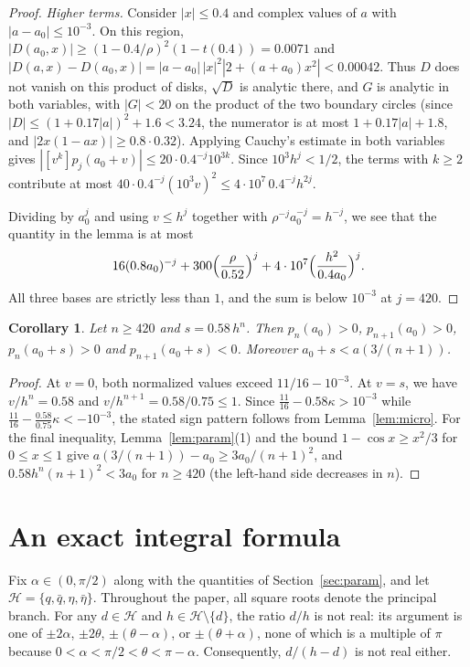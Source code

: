 \documentclass[11pt]{amsart}
\newtheorem{corollary}[theorem]{Corollary}
\theoremstyle{remark}
\begin{document}
\begin{proof}
\emph{Higher terms.} Consider $|x|\le0.4$ and complex values of $a$ with
$|a-a_0|\le10^{-3}$. On this region,
$|D(a_0,x)|\ge(1-0.4/\rho)^2(1-t(0.4))=0.0071$ and
$|D(a,x)-D(a_0,x)|=|a-a_0|\,|x|^2|2+(a+a_0)x^2|<0.00042$. Thus $D$ does not
vanish on this product of disks, $\sqrt D$ is analytic there, and $G$ is
analytic in both variables, with $|G|<20$ on the product of the two boundary
circles (since $|D|\le(1+0.17|a|)^2+1.6<3.24$, the numerator is at most
$1+0.17|a|+1.8$, and $|2x(1-ax)|\ge0.8\cdot0.32$). Applying Cauchy's estimate
in both variables gives $|[v^k]p_j(a_0+v)|\le20\cdot0.4^{-j}10^{3k}$. Since
$10^3h^j<1/2$, the terms with $k\ge2$ contribute at most
$40\cdot0.4^{-j}(10^3v)^2\le4\cdot10^7\,0.4^{-j}h^{2j}$.

Dividing by $a_0^j$ and using $v\le h^j$ together with
$\rho^{-j}a_0^{-j}=h^{-j}$, we see that the quantity in the lemma is at most
\[
 16(0.8a_0)^{-j}+300\Bigl(\frac{\rho}{0.52}\Bigr)^{j}+4\cdot10^7\Bigl(\frac{h^2}{0.4a_0}\Bigr)^{j}.
\]
All three bases are strictly less than $1$, and the sum is below $10^{-3}$
at $j=420$.
\end{proof}

\begin{corollary}\label{cor:micro}
Let $n\ge420$ and $s=0.58\,h^n$. Then $p_n(a_0)>0$, $p_{n+1}(a_0)>0$,
$p_n(a_0+s)>0$ and $p_{n+1}(a_0+s)<0$. Moreover $a_0+s<a(3/(n+1))$.
\end{corollary}

\begin{proof}
At $v=0$, both normalized values exceed $11/16-10^{-3}$. At $v=s$, we have
$v/h^n=0.58$ and $v/h^{n+1}=0.58/0.75\le1$. Since
$\frac{11}{16}-0.58\kappa>10^{-3}$ while
$\frac{11}{16}-\frac{0.58}{0.75}\kappa<-10^{-3}$, the stated sign pattern
follows from Lemma~\ref{lem:micro}. For the final inequality,
Lemma~\ref{lem:param}(1) and the bound $1-\cos x\ge x^2/3$ for $0\le x\le1$
give $a(3/(n+1))-a_0\ge3a_0/(n+1)^2$, and $0.58h^n(n+1)^2<3a_0$ for
$n\ge420$ (the left-hand side decreases in $n$).
\end{proof}

\section{An exact integral formula}\label{sec:integral}

Fix $\alpha\in(0,\pi/2)$ along with the quantities of
Section~\ref{sec:param}, and let $\mathcal H=\{q,\bar q,\eta,\bar\eta\}$.
Throughout the paper, all square roots denote the principal branch. For any
$d\in\mathcal H$ and $h\in\mathcal H\setminus\{d\}$, the ratio $d/h$ is not
real: its argument is one of $\pm2\alpha$, $\pm2\theta$,
$\pm(\theta-\alpha)$, or $\pm(\theta+\alpha)$, none of which is a multiple
of $\pi$ because $0<\alpha<\pi/2<\theta<\pi-\alpha$. Consequently,
$d/(h-d)$ is not real either.
\end{document}
